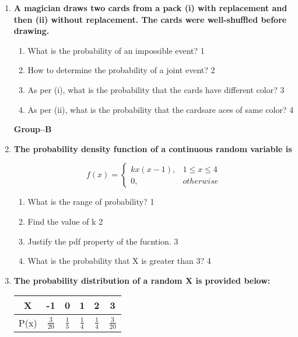 \documentclass{article}
\begin{document}
\begin{enumerate}
  
   \item
	  \textbf{A magician draws two cards from a pack (i) with replacement and then (ii) without replacement. The cards were well-shuffled before drawing.} 
  
  \begin{enumerate}
    \item
	What is the probability of an impossible event? \hfill 1
    \item
	How to determine the probability of a joint event?  \hfill 2
    \item  
	As per (i), what is the probability that the cards have different color? \hfill 3
    \item
	As per (ii), what is the probability that the cardsare aces of same color?  \hfill 4
  \end{enumerate}
  
    \begin{center}
  \textbf{Group--B}
  \end{center}
  
      \item
  \textbf{The probability density function of a continuous random variable is}

$$
  f(x) =
\begin{cases}
kx(x-1),  & 1 \le x \le 4 \\
0, & otherwise
\end{cases}
$$

  \begin{enumerate}
    \item
	What is the range of probability? \hfill 1
    \item
    	Find the value of k \hfill 2
    \item
    	Justify the pdf property of the fucntion. \hfill 3
     \item
     	What is the probability that X is greater than 3?  \hfill 4
  \end{enumerate}

  
     \item
	  \textbf{The probability distribution of a random X is provided below:} 
	  
	  \begin{table}[h]
	  \centering
\begin{tabular}{c|ccccc}
X & -1 & 0 & 1 & 2 & 3 \\ \hline
P(x) & $\frac 3{20}$ & $\frac 15$ & $\frac 14$ & $\frac 14$ & $\frac 3{20}$
\end{tabular}
\end{table}
  

\end{enumerate}
\end{document}
